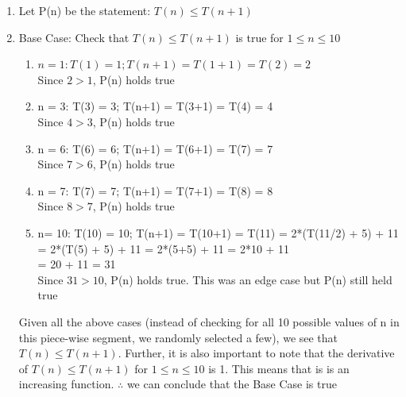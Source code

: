 \documentclass[11pt]{article}
\begin{document}
\begin{enumerate}
\begin{enumerate}
        \begin{enumerate}
            \item Let P(n) be the statement: $T(n) \leq T(n+1)$
            \item Base Case: Check that $T(n) \leq T(n+1)$ is true for $1 \leq n \leq 10$
            \begin{enumerate}
                \item $n = 1: T(1) = 1; T(n+1) = T(1+1) = T(2) = 2$\\
                Since $2 >1$, P(n) holds true
                \item n = 3: T(3) = 3; T(n+1) = T(3+1) = T(4) = 4\\
                Since $4 > 3$, P(n) holds true
                \item n = 6: T(6) = 6; T(n+1) = T(6+1) = T(7) = 7\\
                Since $7 > 6$, P(n) holds true
                \item n = 7: T(7) = 7; T(n+1) = T(7+1) = T(8) = 8\\
                Since $8 > 7$, P(n) holds true
                \item n= 10: T(10) = 10; T(n+1) = T(10+1) = T(11) = 2*(T(11/2) + 5) + 11 \\
                = 2*(T(5) + 5) + 11
                = 2*(5+5) + 11 = 2*10 + 11\\
                = 20 + 11 = 31\\
                Since $31 > 10$, P(n) holds true. This was an edge case but P(n) still held true
            \end{enumerate}
            Given all the above cases (instead of checking for all 10 possible values of n in this piece-wise segment, we randomly selected a few), we see that $T(n) \leq T(n+1)$.
            Further, it is also important to note that the derivative of $T(n) \leq T(n+1)$ for $1 \leq n \leq 10$ is 1. This means that is is an increasing function.
            $\therefore$ we can conclude that the Base Case is true
            

\end{enumerate}
\end{enumerate}
\end{enumerate}
\end{document}
